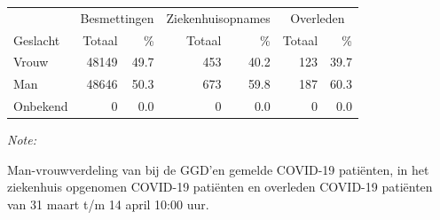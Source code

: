 \documentclass[
  english,
  man,floatsintext]{apa6}
\begin{document}
\begin{table}
\centering\begingroup\fontsize{11}{13}\selectfont

\begin{threeparttable}
\begin{tabular}{lrrrrrr}
\toprule
\multicolumn{1}{c}{ } & \multicolumn{2}{c}{Besmettingen} & \multicolumn{2}{c}{Ziekenhuisopnames} & \multicolumn{2}{c}{Overleden} \\
\cmidrule(l{3pt}r{3pt}){2-3} \cmidrule(l{3pt}r{3pt}){4-5} \cmidrule(l{3pt}r{3pt}){6-7}
Geslacht & Totaal & \% & Totaal & \% & Totaal & \%\\
\midrule
Vrouw & 48149 & 49.7 & 453 & 40.2 & 123 & 39.7\\
Man & 48646 & 50.3 & 673 & 59.8 & 187 & 60.3\\
Onbekend & 0 & 0.0 & 0 & 0.0 & 0 & 0.0\\
\bottomrule
\end{tabular}
\begin{tablenotes}
\item \textit{Note: } 
\item Man-vrouwverdeling van bij de GGD’en gemelde COVID-19 patiënten, in het ziekenhuis opgenomen COVID-19 patiënten en overleden COVID-19 patiënten van 31 maart t/m 14 april 10:00 uur.
\end{tablenotes}
\end{threeparttable}
\endgroup{}
\end{table}
\newpage
\end{document}
